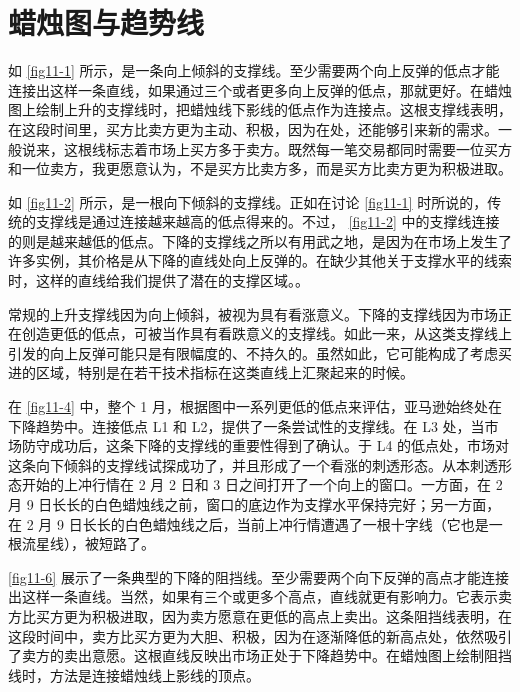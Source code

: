 \chapter{蜡烛图与趋势线\label{ch11}}
如 \autoref{fig11-1} 所示，是一条向上倾斜的支撑线。至少需要两个向上反弹的低点才能连接出这样一条直线，如果通过三个或者更多向上反弹的低点，那就更好。在蜡烛图上绘制上升的支撑线时，把蜡烛线下影线的低点作为连接点。这根支撑线表明，在这段时间里，买方比卖方更为主动、积极，因为在处，还能够引来新的需求。一般说来，这根线标志着市场上买方多于卖方。既然每一笔交易都同时需要一位买方和一位卖方，我更愿意认为，不是买方比卖方多，而是买方比卖方更为积极进取。

如 \autoref{fig11-2} 所示，是一根向下倾斜的支撑线。正如在讨论 \autoref{fig11-1} 时所说的，传统的支撑线是通过连接越来越高的低点得来的。不过， \autoref{fig11-2} 中的支撑线连接的则是越来越低的低点。下降的支撑线之所以有用武之地，是因为在市场上发生了许多实例，其价格是从下降的直线处向上反弹的。在缺少其他关于支撑水平的线索时，这样的直线给我们提供了潜在的支撑区域。。


常规的上升支撑线因为向上倾斜，被视为具有看涨意义。下降的支撑线因为市场正在创造更低的低点，可被当作具有看跌意义的支撑线。如此一来，从这类支撑线上引发的向上反弹可能只是有限幅度的、不持久的。虽然如此，它可能构成了考虑买进的区域，特别是在若干技术指标在这类直线上汇聚起来的时候。

在 \autoref{fig11-4} 中，整个 1 月，根据图中一系列更低的低点来评估，亚马逊始终处在下降趋势中。连接低点 L1 和 L2，提供了一条尝试性的支撑线。在 L3 处，当市场防守成功后，这条下降的支撑线的重要性得到了确认。于 L4 的低点处，市场对这条向下倾斜的支撑线试探成功了，并且形成了一个看涨的刺透形态。从本刺透形态开始的上冲行情在 2 月 2 日和 3 日之间打开了一个向上的窗口。一方面，在 2 月 9 日长长的白色蜡烛线之前，窗口的底边作为支撑水平保持完好；另一方面，在 2 月 9 日长长的白色蜡烛线之后，当前上冲行情遭遇了一根十字线（它也是一根流星线），被短路了。


\autoref{fig11-6} 展示了一条典型的下降的阻挡线。至少需要两个向下反弹的高点才能连接出这样一条直线。当然，如果有三个或更多个高点，直线就更有影响力。它表示卖方比买方更为积极进取，因为卖方愿意在更低的高点上卖出。这条阻挡线表明，在这段时间中，卖方比买方更为大胆、积极，因为在逐渐降低的新高点处，依然吸引了卖方的卖出意愿。这根直线反映出市场正处于下降趋势中。在蜡烛图上绘制阻挡线时，方法是连接蜡烛线上影线的顶点。

